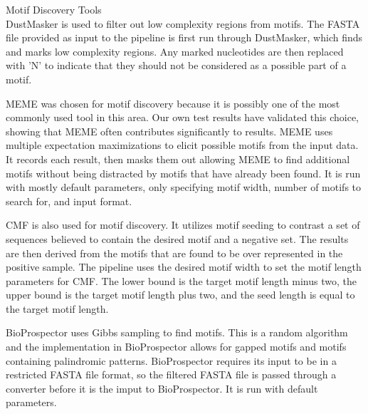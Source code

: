\documentclass[12pt]{article}
\newenvironment{SLOPPY}{\begin{sloppypar}\hbadness=10000}{\end{sloppypar}}
\begin{document}
\begin{SLOPPY}
Motif Discovery Tools\\

\indent
DustMasker \cite{citeulike:7471857} is used to filter out low complexity
regions from motifs.
The FASTA file provided as input to the pipeline is first run through
DustMasker, which finds and marks low complexity regions. Any marked nucleotides
are then replaced with 'N' to indicate that they should not be considered as a
possible part of a motif.\\
\end{SLOPPY}

\begin{SLOPPY}
MEME \cite{pmid7584402} was chosen for motif discovery because it
is possibly one of the most commonly used tool in this area. Our own test
results have validated this choice, showing that MEME often contributes 
significantly to results. %
MEME uses multiple expectation maximizations to elicit possible motifs from the
input data. It records each result, then masks them out allowing MEME to find
additional motifs without being distracted by motifs that have already been
found.
It is run with mostly default parameters, only specifying motif width,
number of motifs to search for, and input format.
\\
\end{SLOPPY}

\begin{SLOPPY}
CMF \cite{Lee01092013} \cite{Mason15112010} is also used for motif discovery.
It utilizes motif seeding to contrast a set of sequences believed to contain
the desired motif and a negative set. The results are then derived from the
motifs that are found to be over represented in the positive sample.
The pipeline uses the desired motif width to set 
the motif length parameters for CMF. The lower bound is the
target motif length minus two, the upper bound is the target motif length plus
two, and the seed length is equal to the target motif length.
\\
\end{SLOPPY}

\begin{SLOPPY}
BioProspector \cite{Liu01bioprospector:discovering} uses Gibbs sampling to
find motifs. This is a random algorithm and the implementation in BioProspector
allows for gapped motifs and motifs containing palindromic patterns.
BioProspector requires its input to be in a restricted FASTA file format, so
the filtered FASTA file is passed through a converter before it is the imput to
BioProspector.
It is run with default parameters.
\\
\end{SLOPPY}
\end{document}
